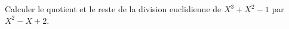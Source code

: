 Calculer le quotient et le reste de la division euclidienne de $X^3+X^2-1$ par $X^2-X+2$.

\bigskip \bigskip